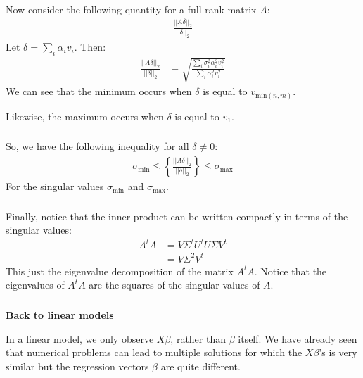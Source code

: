 \begin{frame}[fragile] \frametitle{}

Now consider the following quantity for a full rank matrix $A$:
\begin{align*}
\frac{|| A\delta ||_2}{||\delta||_2}
\end{align*}
\pause Let $\delta = \sum_i \alpha_i v_i$. Then:
\begin{align*}
\frac{|| A\delta ||_2}{||\delta||_2}
  &= \sqrt{\frac{\sum_i \sigma_i^2 \alpha_i^2 v_i^2}{\sum_i \alpha_i^2 v_i^2}}
\end{align*}
\pause We can see that the minimum occurs when $\delta$ is equal to $v_{\text{min}(n,m)}$.

\pause Likewise, the maximum occurs when $\delta$ is equal to $v_1$.

\end{frame}

\begin{frame}[fragile] \frametitle{}

So, we have the following inequality for all $\delta \neq 0$:
\begin{align*}
\sigma_{\text{min}} \leq \left\{\frac{|| A\delta ||_2}{||\delta||_2}\right\} \leq \sigma_{\text{max}}
\end{align*}
For the singular values $\sigma_{\text{min}}$ and $\sigma_{\text{max}}$.

\end{frame}

\begin{frame}[fragile] \frametitle{}

Finally, notice that the inner product can be written compactly in terms of
the singular values:
\begin{align*}
A^t A &= V \Sigma^t U^t U \Sigma V^t \\
&=  V \Sigma^2 V^t
\end{align*}
\pause This just the eigenvalue decomposition of the matrix $A^t A$. Notice
that the eigenvalues of $A^t A$ are the squares of the singular values of
$A$.

\end{frame}

\begin{frame}[fragile] \frametitle{}

\textbf{Back to linear models}

In a linear model, we only observe $X \beta$, rather than $\beta$ itself.
We have already seen that numerical problems can lead to multiple solutions
for which the $X\beta$'s is very similar but the regression vectors $\beta$
are quite different.

\end{frame}



